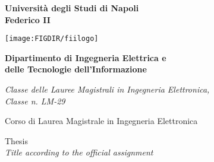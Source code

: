 %
%
%

%
%
\pagestyle{empty}
\begin{center}

%

{\bfseries\Huge Università degli Studi di Napoli\\}
\vspace{2.54mm}
{\bfseries\Huge Federico II\\}
\vspace{5mm}

\centerline{\mbox{\texttt{[image: \\FIGDIR/fiilogo]}}}

\medskip
{\bfseries\LARGE Dipartimento di Ingegneria Elettrica e\\}
\vspace{2.54mm}
{\bfseries\LARGE delle Tecnologie dell'Informazione\\}
\vspace{2.54mm}

{\emph{\large Classe delle Lauree Magistrali in Ingegneria Elettronica,\\}}
{\emph{\large Classe n. LM-29\\}}
\vspace{2.54mm}

{\large Corso di Laurea Magistrale in Ingegneria Elettronica\\}
\vspace{5mm}


%
%

\vfill
{\Large Thesis\\}
\vspace{4mm}
{\emph{\LARGE Title according to the official assignment\\}}		%
\vspace{4mm}

\vfill


\end{center}
